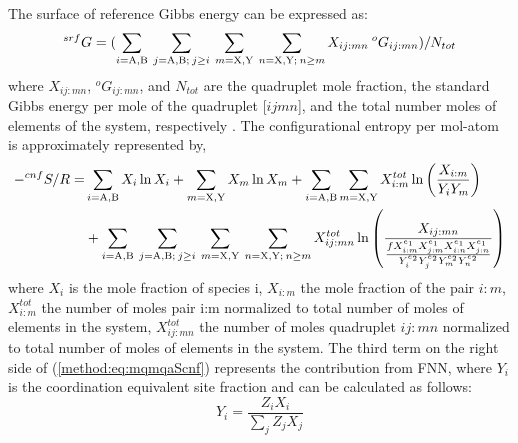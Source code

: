 The surface of reference Gibbs energy can be expressed as:
\begin{equation} \label{method:eq:mqmqaGsrf}
    ^{srf}G=(\sum_{i={\rm A,B}}\:\sum_{j={\rm A,B};\:j\geq i}\:\sum_{m={\rm X,Y}}\:\sum_{n={\rm X,Y};\:n\geq m}X_{ij:mn}\:^oG_{ij:mn})/N_{tot}
\end{equation}
where $X_{ij:mn}$, $^oG_{ij:mn}$, and $N_{tot}$ are the quadruplet mole fraction, the standard Gibbs energy per mole of the quadruplet [$ijmn$], and the total number moles of elements of the system, respectively \cite{pelton2018phase}. The configurational entropy per mol-atom is approximately represented by,
\begin{equation}\label{method:eq:mqmqaScnf}
    \begin{aligned}
        -^{cnf}S/R=&\sum_{i={\rm A,B}}{X_i\ln X_i}+\sum_{m={\rm X,Y}}{X_m\ln X_m}+\sum_{i={\rm A,B}}\sum_{m={\rm X,Y}}{X_{i:m}^{tot}\ln{\left(\frac{X_{i:m}}{Y_iY_m}\right)}}\\&+\sum_{i={\rm A,B}}\:\sum_{j={\rm A,B};\:j\geq i}\:\sum_{m={\rm X,Y}}\:\sum_{n={\rm X,Y};\:n\geq m}X_{ij:mn}^{tot}\ln{\left(\frac{X_{ij:mn}}{\frac{fX_{i:m}^{e_1}X_{j:m}^{e_1}X_{i:n}^{e_1}X_{j:n}^{e_1}}{Y_i^{e_2}Y_j^{e_2}Y_m^{e_2}Y_n^{e_2}}}\right)}
    \end{aligned}
\end{equation}
where $X_i$ is the mole fraction of species i, $X_{i:m}$ the mole fraction of the pair $i:m$, $X_{i:m}^{tot}$ the number of moles pair i:m normalized to total number of moles of elements in the system, $X_{ij:mn}^{tot}$ the number of moles quadruplet $ij:mn$ normalized to total number of moles of elements in the system. The third term on the right side of (\ref{method:eq:mqmqaScnf}) represents the contribution from FNN, where $Y_i$ is the coordination equivalent site fraction and can be calculated as follows:
\begin{equation} \label{method:eq:mqmqaYi}
    Y_i=\frac{Z_iX_i}{\sum_{j}{Z_jX_j}}
\end{equation}

